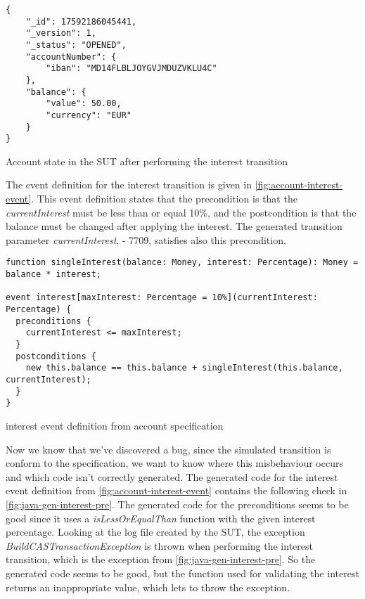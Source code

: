 \begin{sourcecode}[h!]
\begin{lstlisting}[]
{
	"_id": 17592186045441,
	"_version": 1,
	"_status": "OPENED",
	"accountNumber": {
		"iban": "MD14FLBLJOYGVJMDUZVKLU4C"
	},
	"balance": {
		"value": 50.00,
		"currency": "EUR"
	}
}
\end{lstlisting}
\caption{Account state in the SUT after performing the interest transition}
\label{fig:interest-opened-account-json}
\end{sourcecode}

The event definition for the interest transition is given in
\autoref{fig:account-interest-event}. This event definition states that the
precondition is that the \textit{currentInterest} must be less than or equal
10\%, and the postcondition is that the balance must be changed after applying
the interest. The generated transition parameter \textit{currentInterest},
- 7709, satisfies also this precondition.

\begin{sourcecode}[h!]
\begin{lstlisting}[]
function singleInterest(balance: Money, interest: Percentage): Money =  balance * interest;

event interest[maxInterest: Percentage = 10%](currentInterest: Percentage) {
  preconditions {
    currentInterest <= maxInterest;
  }
  postconditions {
    new this.balance == this.balance + singleInterest(this.balance, currentInterest);
  }
}
\end{lstlisting}
\caption{interest event definition from account specification}
\label{fig:account-interest-event}
\end{sourcecode}

Now we know that we've discovered a bug, since the simulated transition is
conform to the specification, we want to know where this misbehaviour occurs and
which code isn't correctly generated. The generated code for the interest event
definition from \autoref{fig:account-interest-event} contains the following
check in \autoref{fig:java-gen-interest-pre}. The generated code for the
preconditions seems to be good since it uses a \textit{isLessOrEqualThan}
function with the given interest percentage. Looking at the log file created by
the SUT, the exception \textit{BuildCASTransactionException} is thrown when
performing the interest transition, which is the exception from
\autoref{fig:java-gen-interest-pre}. So the generated code seems to be good, but
the function used for validating the interest returns an inappropriate value,
which lets to throw the exception.

